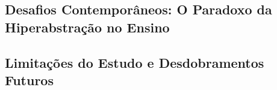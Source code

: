 \subsection{Desafios Contemporâneos: O Paradoxo da Hiperabstração no Ensino}
\label{subsec:paradoxo_abstracao}


\subsection{Limitações do Estudo e Desdobramentos Futuros}
\label{subsec:limitacoes_estudo}

